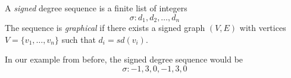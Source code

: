 \begin{frame}
    \begin{definition}
        A \textit{signed} degree sequence is a finite list of integers
        \begin{equation*}
            \sigma : d_1, d_2, \dots, d_n
        \end{equation*}
        The sequence is \textit{graphical} if there exists a signed graph $(V,E)$ with vertices $V = \{v_1,\dots,v_n\}$ such that $d_i = sd(v_i)$.
    \end{definition}
    In our example from before, the signed degree sequence would be
    \begin{equation*}
        \sigma : -1, 3, 0, -1, 3, 0
    \end{equation*}
\end{frame}

